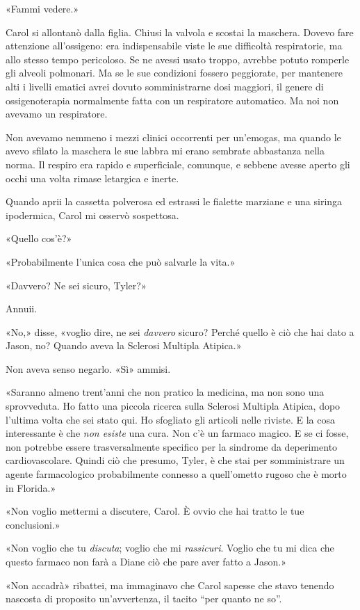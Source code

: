 «Fammi vedere.»

Carol si allontanò dalla figlia. Chiusi la valvola e scostai la
maschera. Dovevo fare attenzione all'ossigeno: era indispensabile viste
le sue difficoltà respiratorie, ma allo stesso tempo pericoloso. Se ne
avessi usato troppo, avrebbe potuto romperle gli alveoli polmonari. Ma
se le sue condizioni fossero peggiorate, per mantenere alti i livelli
ematici avrei dovuto somministrarne dosi maggiori, il genere di
ossigenoterapia normalmente fatta con un respiratore automatico. Ma noi
non avevamo un respiratore.

Non avevamo nemmeno i mezzi clinici occorrenti per un'emogas, ma quando
le avevo sfilato la maschera le sue labbra mi erano sembrate abbastanza
nella norma. Il respiro era rapido e superficiale, comunque, e sebbene
avesse aperto gli occhi una volta rimase letargica e inerte.

Quando aprii la cassetta polverosa ed estrassi le fialette marziane e
una siringa ipodermica, Carol mi osservò sospettosa.

«Quello cos'è?»

«Probabilmente l'unica cosa che può salvarle la vita.»

«Davvero? Ne sei sicuro, Tyler?»

Annuii.

«No,» disse, «voglio dire, ne sei \emph{davvero} sicuro? Perché quello è
ciò che hai dato a Jason, no? Quando aveva la Sclerosi Multipla
Atipica.»

Non aveva senso negarlo. «Sì» ammisi.

«Saranno almeno trent'anni che non pratico la medicina, ma non sono una
sprovveduta. Ho fatto una piccola ricerca sulla Sclerosi Multipla
Atipica, dopo l'ultima volta che sei stato qui. Ho sfogliato gli
articoli nelle riviste. E la cosa interessante è che \emph{non esiste}
una cura. Non c'è un farmaco magico. E se ci fosse, non potrebbe essere
trasversalmente specifico per la sindrome da deperimento
cardiovascolare. Quindi ciò che presumo, Tyler, è che stai per
somministrare un agente farmacologico probabilmente connesso a
quell'ometto rugoso che è morto in Florida.»

«Non voglio mettermi a discutere, Carol. È ovvio che hai tratto le tue
conclusioni.»

«Non voglio che tu \emph{discuta}; voglio che mi \emph{rassicuri}.
Voglio che tu mi dica che questo farmaco non farà a Diane ciò che pare
aver fatto a Jason.»

«Non accadrà» ribattei, ma immaginavo che Carol sapesse che stavo
tenendo nascosta di proposito un'avvertenza, il tacito ``per quanto ne
so''.

